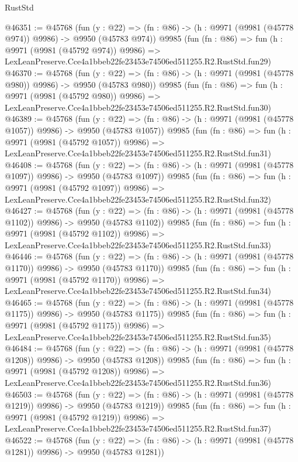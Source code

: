 \begin{lexlean}{RustStd}
\begin{coremodule}
@46351 := @45768
    (fun (y : @22) => (fn : @86) -> (h : @9971 (@9981 (@45778 @974)) @9986) -> @9950 (@45783 @974))
    @9985
    (fun (fn : @86) =>
    fun (h : @9971 (@9981 (@45792 @974)) @9986) =>
    LexLeanPreserve.Cce4a1bbeb22fe23453e74506ed511255.R2.RustStd.fun29)
@46370 := @45768
    (fun (y : @22) => (fn : @86) -> (h : @9971 (@9981 (@45778 @980)) @9986) -> @9950 (@45783 @980))
    @9985
    (fun (fn : @86) =>
    fun (h : @9971 (@9981 (@45792 @980)) @9986) =>
    LexLeanPreserve.Cce4a1bbeb22fe23453e74506ed511255.R2.RustStd.fun30)
@46389 := @45768
    (fun (y : @22) =>
    (fn : @86) -> (h : @9971 (@9981 (@45778 @1057)) @9986) -> @9950 (@45783 @1057))
    @9985
    (fun (fn : @86) =>
    fun (h : @9971 (@9981 (@45792 @1057)) @9986) =>
    LexLeanPreserve.Cce4a1bbeb22fe23453e74506ed511255.R2.RustStd.fun31)
@46408 := @45768
    (fun (y : @22) =>
    (fn : @86) -> (h : @9971 (@9981 (@45778 @1097)) @9986) -> @9950 (@45783 @1097))
    @9985
    (fun (fn : @86) =>
    fun (h : @9971 (@9981 (@45792 @1097)) @9986) =>
    LexLeanPreserve.Cce4a1bbeb22fe23453e74506ed511255.R2.RustStd.fun32)
@46427 := @45768
    (fun (y : @22) =>
    (fn : @86) -> (h : @9971 (@9981 (@45778 @1102)) @9986) -> @9950 (@45783 @1102))
    @9985
    (fun (fn : @86) =>
    fun (h : @9971 (@9981 (@45792 @1102)) @9986) =>
    LexLeanPreserve.Cce4a1bbeb22fe23453e74506ed511255.R2.RustStd.fun33)
@46446 := @45768
    (fun (y : @22) =>
    (fn : @86) -> (h : @9971 (@9981 (@45778 @1170)) @9986) -> @9950 (@45783 @1170))
    @9985
    (fun (fn : @86) =>
    fun (h : @9971 (@9981 (@45792 @1170)) @9986) =>
    LexLeanPreserve.Cce4a1bbeb22fe23453e74506ed511255.R2.RustStd.fun34)
@46465 := @45768
    (fun (y : @22) =>
    (fn : @86) -> (h : @9971 (@9981 (@45778 @1175)) @9986) -> @9950 (@45783 @1175))
    @9985
    (fun (fn : @86) =>
    fun (h : @9971 (@9981 (@45792 @1175)) @9986) =>
    LexLeanPreserve.Cce4a1bbeb22fe23453e74506ed511255.R2.RustStd.fun35)
@46484 := @45768
    (fun (y : @22) =>
    (fn : @86) -> (h : @9971 (@9981 (@45778 @1208)) @9986) -> @9950 (@45783 @1208))
    @9985
    (fun (fn : @86) =>
    fun (h : @9971 (@9981 (@45792 @1208)) @9986) =>
    LexLeanPreserve.Cce4a1bbeb22fe23453e74506ed511255.R2.RustStd.fun36)
@46503 := @45768
    (fun (y : @22) =>
    (fn : @86) -> (h : @9971 (@9981 (@45778 @1219)) @9986) -> @9950 (@45783 @1219))
    @9985
    (fun (fn : @86) =>
    fun (h : @9971 (@9981 (@45792 @1219)) @9986) =>
    LexLeanPreserve.Cce4a1bbeb22fe23453e74506ed511255.R2.RustStd.fun37)
@46522 := @45768
    (fun (y : @22) =>
    (fn : @86) -> (h : @9971 (@9981 (@45778 @1281)) @9986) -> @9950 (@45783 @1281))

\end{coremodule}
\end{lexlean}
